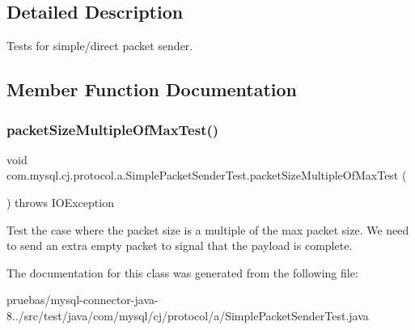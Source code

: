 \subsection{Detailed Description}
Tests for simple/direct packet sender. 

\subsection{Member Function Documentation}
\mbox{\label{classcom_1_1mysql_1_1cj_1_1protocol_1_1a_1_1_simple_packet_sender_test_a5936ffe2c8c3738af9838f7fa5a05624}} 
\subsubsection{\texorpdfstring{packet\+Size\+Multiple\+Of\+Max\+Test()}{packetSizeMultipleOfMaxTest()}}
{\footnotesize\ttfamily void com.\+mysql.\+cj.\+protocol.\+a.\+Simple\+Packet\+Sender\+Test.\+packet\+Size\+Multiple\+Of\+Max\+Test (\begin{DoxyParamCaption}{ }\end{DoxyParamCaption}) throws I\+O\+Exception}

Test the case where the packet size is a multiple of the max packet size. We need to send an extra empty packet to signal that the payload is complete. 

The documentation for this class was generated from the following file\+:\begin{DoxyCompactItemize}
\item 
pruebas/mysql-\/connector-\/java-\/8../src/test/java/com/mysql/cj/protocol/a/Simple\+Packet\+Sender\+Test.\+java\end{DoxyCompactItemize}

